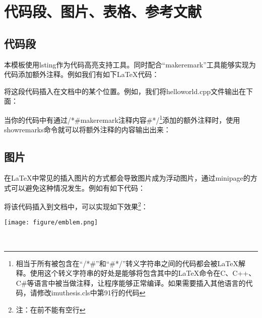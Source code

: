 \chapter{代码段、图片、表格、参考文献}

    \section{代码段}
        本模板使用lsting作为代码高亮支持工具。同时配合“\tbs makeremark”工具能够实现为代码添加额外注释。例如我们有如下\LaTeX  代码：
        \begin{quote}
            
        \end{quote}

        将这段代码插入在文档中的某个位置。例如，我们将helloworld.cpp文件输出在下面：
        
        
        当你的代码中有通过/*\#\tbs makeremark{注释内容}\#*/\footnote{相当于所有被包含在“/*\#”和“\#*/”转义字符串之间的代码都会被\LaTeX 解释。使用这个转义字符串的好处是能够将包含其中的\LaTeX 命令在C、C++、C\#等语言中被当做注释，让程序能够正常编译。如果需要插入其他语言的代码，请修改imuthesis.cls中第91行的代码}添加的额外注释时，使用\tbs showremarks命令就可以将额外注释的内容输出出来：
        \begin{quote}
            \showremarks
        \end{quote}

    \section{图片}
        在\LaTeX 中常见的插入图片的方式都会导致图片成为浮动图片，通过minipage的方式可以避免这种情况发生。例如有如下代码：
        
        
        将该代码插入到文档中，可以实现如下效果\footnote{注：在\tbs{}前不能有空行}：
        \\[\intextsep] 
            \begin{minipage}{\textwidth} 
                \centering
                \texttt{[image: figure/emblem.png]}
                \label{fig:emblem} 
            \end{minipage}
        \\[\intextsep] 

